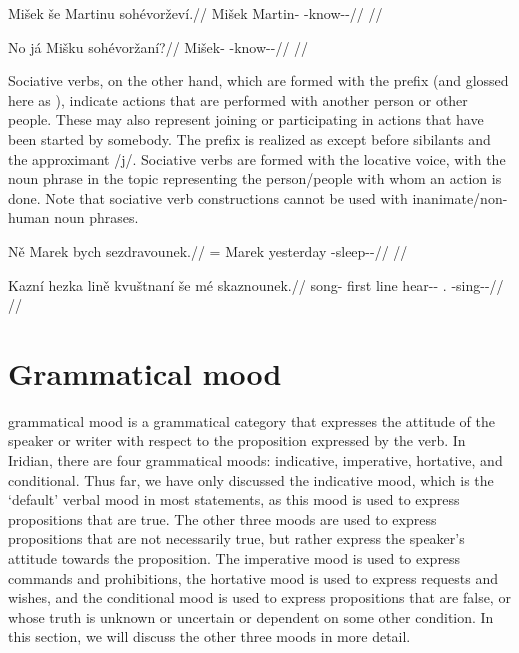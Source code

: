 \pex
\begingl
\gla Mišek še Martinu sohévorževí.//
\glb Mišek \Com{} Martin-\Ins{} \Rec{}-know-\Av{}-\Cont{}//
\glft {}//
\endgl
\xe

\pex
\begingl
\gla No já Mišku sohévoržaní?//
\glb \Q{}  Mišek-\Ins{} \Rec{}-know-\Av{}-\Ret{}//
\glft {}//
\endgl
\xe

Sociative verbs, on the other hand, which are formed with
the prefix  (and glossed here as \Soc{}), indicate actions that are
performed with another person or other people. These may also represent joining
or participating in actions that have been started by somebody. The prefix
 is realized as  except before sibilants and the approximant
/j/. Sociative verbs are formed with the locative voice, with the noun phrase in
the topic representing the person/people with whom an action is done. Note that
sociative verb constructions cannot be used with inanimate/non-human noun
phrases.

\pex
\begingl
\gla Ně Marek bych sezdravounek.//
\glb \Pl{}= Marek yesterday \Soc{}-sleep-\Lv{}-\Pf{}//
\glft {}//
\endgl
\xe

\pex
\begingl
\gla Kazní hezka lině kvuštnaní še m\'e skaznounek.//
\glb song-\Gen{} first line hear-\Pv{}-\Ret{} \Com{} \First\Pl{}.\Str{} \Soc{}-sing-\Lv{}-\Pf{}//
\glft {}//
\endgl
\xe

\section{Grammatical mood}\label{sec:mood}

{\sc grammatical mood} is a grammatical category that expresses the attitude of
the speaker or writer with respect to the proposition expressed by the verb. In
Iridian, there are four grammatical moods: indicative,
imperative, hortative, and
conditional. Thus far, we have only discussed the
indicative mood, which is the `default' verbal mood in most statements, as this
mood is used to express propositions that are true. The other three moods are
used to express propositions that are not necessarily true, but rather express
the speaker's attitude towards the proposition. The imperative mood is used to
express commands and prohibitions, the hortative mood is used to express
requests and wishes, and the conditional mood is used to express propositions
that are false, or whose truth is unknown or uncertain or dependent on some
other condition. In this section, we will discuss the other three moods in more
detail.


